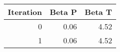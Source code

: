 \begin{tabular}{rrr}
\toprule
 Iteration &  Beta P &  Beta T \\
\midrule
         0 &    0.06 &    4.52 \\
         1 &    0.06 &    4.52 \\
\bottomrule
\end{tabular}
